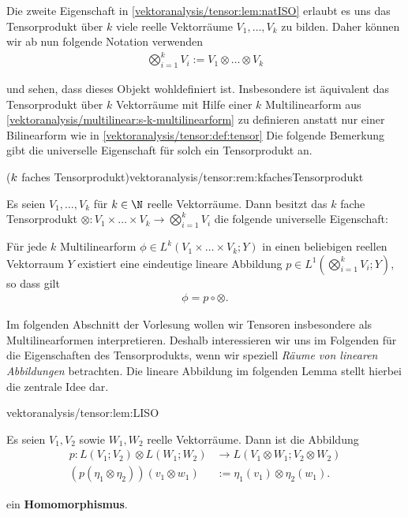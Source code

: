 \documentclass[letterpaper,10pt,english]{jupyterBook}
\begin{document}
\par
Die zweite Eigenschaft in \cref{vektoranalysis/tensor:lem:natISO} erlaubt es uns das Tensorprodukt über \(k\) viele reelle Vektorräume \(V_1,\ldots, V_k\) zu bilden.
Daher können wir ab nun folgende Notation verwenden
\begin{align*}
\bigotimes_{i=1}^k V_i :=V_1\otimes\ldots\otimes V_k
\end{align*}
\par
und sehen, dass dieses Objekt wohldefiniert ist.
Insbesondere ist äquivalent das Tensorprodukt über \(k\) Vektorräume mit Hilfe einer \(k\) Multilinearform aus \cref{vektoranalysis/multilinear:s-k-multilinearform}  zu definieren anstatt nur einer Bilinearform wie in \cref{vektoranalysis/tensor:def:tensor} 
Die folgende Bemerkung gibt die universelle Eigenschaft für solch ein Tensorprodukt an.
\begin{remark}{(\protect\(k\protect\) faches Tensorprodukt)}{vektoranalysis/tensor:rem:kfachesTensorprodukt}



\par
Es seien \(V_1,\ldots, V_k\) für \(k \in \N\) reelle Vektorräume.
Dann besitzt das \(k\) fache Tensorprodukt \(\otimes \colon V_1 \times \ldots \times V_k \rightarrow \bigotimes_{i=1}^k V_i\) die folgende universelle Eigenschaft:

\par
Für jede \(k\) Multilinearform \(\phi\in L^k(V_1\times\ldots\times V_k; Y)\) in einen beliebigen reellen Vektorraum \(Y\) existiert eine eindeutige lineare Abbildung
\(p \in L^1(\bigotimes_{i=1}^k V_i; Y)\), so dass gilt
\begin{align*}
\phi = p \circ \otimes.
\end{align*}\end{remark}

\par
Im folgenden Abschnitt der Vorlesung wollen wir Tensoren insbesondere als Multilinearformen interpretieren.
Deshalb interessieren wir uns im Folgenden für die Eigenschaften des Tensorprodukts, wenn wir speziell \emph{Räume von linearen Abbildungen} betrachten.
Die lineare Abbildung im folgenden Lemma stellt hierbei die zentrale Idee dar.
\begin{lemma}{}{vektoranalysis/tensor:lem:LISO}



\par
Es seien \(V_1, V_2\) sowie \(W_1, W_2\) reelle Vektorräume.
Dann ist die Abbildung
\begin{align*}
p:L(V_1; V_2)\otimes L(W_1; W_2) &\rightarrow L(V_1\otimes W_1; V_2\otimes W_2)\\
(p(\eta_1\otimes\eta_2))(v_1\otimes w_1)&:= \eta_1(v_1) \otimes \eta_2(w_1).
\end{align*}
\par
ein \textbf{Homomorphismus}.
\end{lemma}
\end{document}
